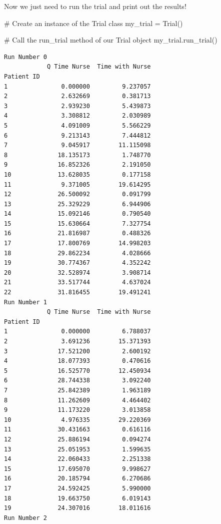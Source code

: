 \documentclass[
  letterpaper,
  DIV=11,
  numbers=noendperiod]{scrreprt}
\newenvironment{Shaded}{}{}
\newcommand{\CommentTok}[1]{\textcolor[rgb]{0.42,0.45,0.49}{#1}}
\newcommand{\NormalTok}[1]{\textcolor[rgb]{0.14,0.16,0.18}{#1}}
\newcommand{\OperatorTok}[1]{\textcolor[rgb]{0.14,0.16,0.18}{#1}}
\begin{document}
Now we just need to run the trial and print out the results!

\begin{Shaded}
\begin{Highlighting}[]
\CommentTok{\# Create an instance of the Trial class}
\NormalTok{my\_trial }\OperatorTok{=}\NormalTok{ Trial()}

\CommentTok{\# Call the run\_trial method of our Trial object}
\NormalTok{my\_trial.run\_trial()}
\end{Highlighting}
\end{Shaded}

\begin{verbatim}
Run Number 0
            Q Time Nurse  Time with Nurse
Patient ID                               
1               0.000000         9.237057
2               2.632669         0.381713
3               2.939230         5.439873
4               3.308812         2.030989
5               4.091009         5.566229
6               9.213143         7.444812
7               9.045917        11.115098
8              18.135173         1.748770
9              16.852326         2.191050
10             13.628035         0.177158
11              9.371005        19.614295
12             26.500092         0.091799
13             25.329229         6.944906
14             15.092146         0.790540
15             15.630664         7.327754
16             21.816987         0.488326
17             17.800769        14.998203
18             29.862234         4.028666
19             30.774367         4.352242
20             32.528974         3.908714
21             33.517744         4.637024
22             31.816455        19.491241
Run Number 1
            Q Time Nurse  Time with Nurse
Patient ID                               
1               0.000000         6.788037
2               3.691236        15.371393
3              17.521200         2.600192
4              18.077393         0.470616
5              16.525770        12.450934
6              28.744338         3.092240
7              25.842389         1.963189
8              11.262609         4.464402
9              11.173220         3.013858
10              4.976335        29.220369
11             30.431663         0.616116
12             25.886194         0.094274
13             25.051953         1.599635
14             22.060433         2.251338
15             17.695070         9.998627
16             20.185794         6.270686
17             24.592425         5.990000
18             19.663750         6.019143
19             24.307016        18.011616
Run Number 2

\end{verbatim}
\end{document}
